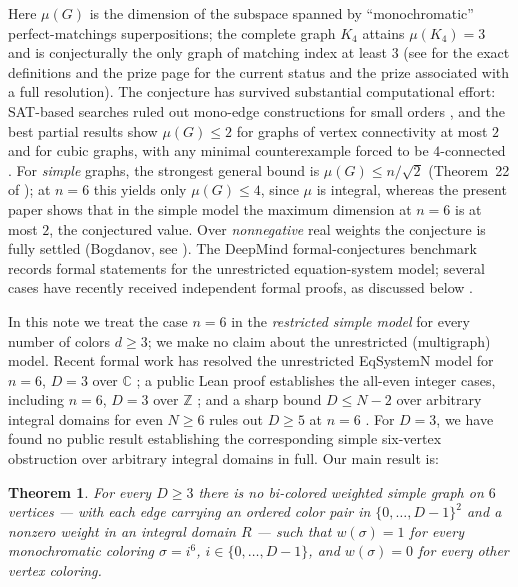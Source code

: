 \documentclass[11pt]{article}
\newtheorem{theorem}{Theorem}
\theoremstyle{definition}
\begin{document}
Here $\mu(G)$ is the dimension of the subspace spanned by
``monochromatic'' perfect-matchings superpositions; the complete graph
$K_4$ attains $\mu(K_4)=3$ and is conjecturally the only graph of
matching index at least $3$ (see \cite{KGS19, GKM24} for the exact
definitions and the prize page \cite{bounty} for the current status and
the prize associated with a full resolution). The conjecture has
survived substantial computational effort: SAT-based searches ruled out
mono-edge constructions for small orders \cite{CLA22}, and the
best partial results show $\mu(G)\le 2$ for graphs of vertex
connectivity at most $2$ and for cubic graphs, with any minimal
counterexample forced to be $4$-connected \cite{CGI24}. For
\emph{simple} graphs, the strongest general bound is
$\mu(G)\le n/\sqrt{2}$ (Theorem~22 of \cite{CG24}); at $n=6$ this yields
only $\mu(G)\le 4$, since $\mu$ is integral, whereas the present paper
shows that in the simple model the maximum dimension at $n=6$ is at
most $2$, the conjectured value. Over
\emph{nonnegative} real weights the conjecture is fully settled
(Bogdanov, see \cite{mathoverflow}). The DeepMind formal-conjectures
benchmark records formal statements for the unrestricted
equation-system model; several cases have recently received
independent formal proofs, as discussed below
\cite{alphaproof, formalconjectures}.

In this note we treat the case $n=6$ in the \emph{restricted simple
model} for every number of colors $d\ge 3$; we make no claim about the
unrestricted (multigraph) model. Recent formal work has resolved the
unrestricted EqSystemN model for $n=6$, $D=3$ over $\mathbb C$
\cite{kg63cert}; a public Lean proof establishes the all-even integer
cases, including $n=6$, $D=3$ over $\mathbb Z$ \cite{kgallevenint}; and
a sharp bound $D\le N-2$ over arbitrary integral domains for even
$N\ge 6$ rules out $D\ge 5$ at $n=6$ \cite{kgsharpbound}. For $D=3$, we
have found no public result establishing the corresponding simple
six-vertex obstruction over arbitrary integral domains in full.
Our main result is:

\begin{theorem}\label{thm:main}
For every $D\ge 3$ there is no bi-colored weighted simple graph on $6$
vertices --- with each edge carrying an ordered color pair in
$\{0,\dots,D-1\}^2$ and a nonzero weight in an integral domain $R$ ---
such that $w(\sigma)=1$ for every monochromatic coloring
$\sigma=i^6$, $i\in\{0,\dots,D-1\}$, and $w(\sigma)=0$ for every other
vertex coloring.
\end{theorem}
\end{document}
